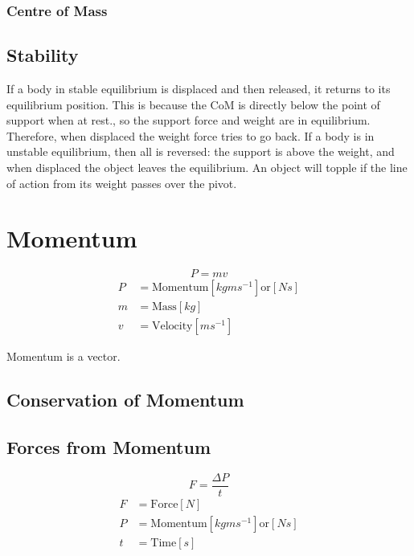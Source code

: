 \subsection{Centre of Mass}


\section{Stability}
If a body in stable equilibrium is displaced and then released, it returns to its equilibrium position. This is because the CoM is directly below the point of support when at rest., so the support force and weight are in equilibrium. Therefore, when displaced the weight force tries to go back.
If a body is in unstable equilibrium, then all is reversed: the support is above the weight, and when displaced the object leaves the equilibrium.
An object will topple if the line of action from its weight passes over the pivot.



\chapter{Momentum}
\[P = mv\]
\begin{align}
	P &= \text{Momentum} \left[ kgms^{-1} \right] \text{or} \left[ Ns \right] \\
	m &= \text{Mass} \left[ kg \right] \\
	v &= \text{Velocity} \left[ ms^{-1} \right] 
\end{align}

Momentum is a vector.

\section{Conservation of Momentum}

\section{Forces from Momentum}
\[F = \frac{\Delta P}{t}\]
\begin{align}
	F &= \text{Force} \left[ N \right] \\
	P &= \text{Momentum} \left[ kgms^{-1} \right] \text{or} \left[ Ns \right] \\
	t &= \text{Time} \left[ s \right] 
\end{align}

